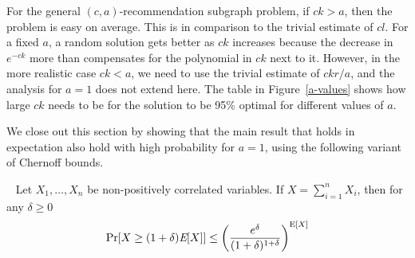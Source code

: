 
For the general $(c, a)$-recommendation subgraph problem, if $ck>a$, then the problem is easy on average. This
is in comparison to the trivial estimate of $cl$. For a fixed $a$, a
random solution gets better as $ck$ increases because the decrease in
$e^{-ck}$ more than compensates for the polynomial in $ck$ next to
it. However, in the more realistic case $ck<a$, we need to use the
trivial estimate of $ckr/a$, and the analysis for $a=1$ does not extend here.
The table in Figure~\ref{a-values} shows how large
$ck$ needs to be for the solution to be 95\% optimal for different
values of $a$.\vs




We close out this section by showing that the main result that holds in expectation also hold with high probability for $a=1$, using the following variant of Chernoff bounds.

\begin{thm}\label{negative_corr_chernoff}~\cite{AugerDoerr2011}
Let $X_1,\ldots, X_n$ be non-positively correlated variables. If $X=\sum_{i=1}^n X_i$, then for any $\delta\geq 0$
\[ \Pr[X \geq (1+\delta)\emph{\text{E}}[X] ] \leq \left(\frac{e^\delta}{(1+\delta)^{1+\delta}}\right)^{\text{E}[X]} \]
\end{thm}

